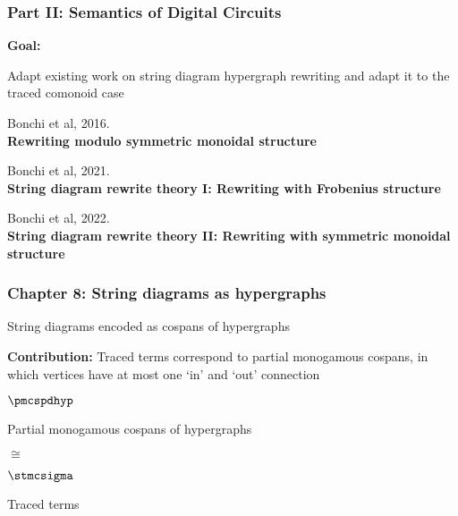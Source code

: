 \begin{frame}
    \frametitle{Part II: Semantics of Digital Circuits}

    \pause

    \LARGE
    \centering

    \textbf{Goal:}

    Adapt existing work on string diagram hypergraph rewriting and adapt it
    to the \alert{traced comonoid} case

    \normalsize

    \vspace{1em}
    \pause

    Bonchi et al, 2016. \\ \textbf{Rewriting modulo symmetric monoidal structure}

    Bonchi et al, 2021. \\ \textbf{String diagram rewrite theory I: Rewriting with Frobenius structure}

    Bonchi et al, 2022. \\ \textbf{String diagram rewrite theory II: Rewriting with symmetric monoidal structure}


\end{frame}

\begin{frame}
    \frametitle{Chapter 8: String diagrams as hypergraphs}

    String diagrams encoded as \alert{cospans of hypergraphs}

    \textbf{Contribution:}
    Traced terms correspond to \alert{partial monogamous} cospans, in which
    vertices have at most one `in' and `out' connection

    \vspace{1em}

    \begin{center}
        \begin{minipage}{0.4\textwidth}
            \centering
            \LARGE
            \(\pmcspdhyp\)

            \Large
            Partial monogamous cospans of hypergraphs

            \vspace{0.5em}

        \end{minipage}
        \qquad
        {\LARGE \(\cong\)}
        \begin{minipage}{0.4\textwidth}
            \centering
            \LARGE
            \(\stmcsigma\)

            \Large
            Traced terms

            \vspace{1em}

        \end{minipage}
    \end{center}

\end{frame}

